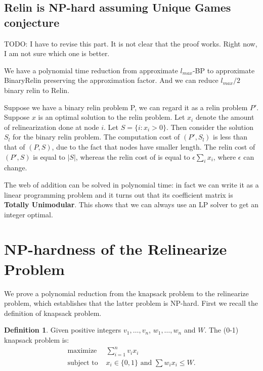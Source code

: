 \documentclass[11pt]{article} %
\theoremstyle{plain}
\theoremstyle{definition}
\newtheorem{definition}{Definition}
\begin{document}
\subsection{Relin is NP-hard assuming Unique Games conjecture}  

TODO: I have to revise this part. It is not clear that the proof works. Right now, I am not sure which one is better. 


We have a polynomial time reduction from approximate $l_{max}$-BP to 
approximate BinaryRelin preserving the approximation factor.  And we can reduce $l_{max}/2$ binary relin to Relin. 

Suppose we have a binary relin problem P, we can regard it as a relin problem $P'$. Suppose $x$ is an optimal solution to the relin problem. Let $x_i$ denote the amount of relinearization done at node $i$. Let $S = \{i: x_i > 0\}$. 
Then consider the solution $S_l$ for the binary relin problem. The computation cost of $(P', S_l)$ is less than that of $(P, S)$, due to the fact that nodes have smaller length.  The relin cost of $(P', S)$ is equal to $|S|$, 
whereas the relin cost of is equal to $\epsilon \sum_i x_i$, where $\epsilon$ can change.  


The web of addition can be solved in polynomial time: in fact we can write it as a linear programming problem and it turns out that its coefficient matrix is {\bf Totally Unimodular}. This shows that we can always use an LP solver to get an integer optimal. 

\fi

\section{NP-hardness of the Relinearize Problem}

We prove a polynomial reduction from the knapsack problem to the relinearize problem, which establishes that the latter problem is NP-hard.  First we recall the definition of  knapsack problem. 


\begin{definition}
Given positive integers $v_1, \ldots, v_n$, $w_1, \ldots ,w_n$ and $W$. The (0-1) knapsack problem is:
\begin{align*}
\mbox{maximize} &\sum_{i=1}^{n} v_i x_i \\
\mbox{subject to } & x_i \in \{0,1\}
\mbox{ and }  \sum w_i x_i \leq W. 
\end{align*}
\end{definition}
\end{document}
